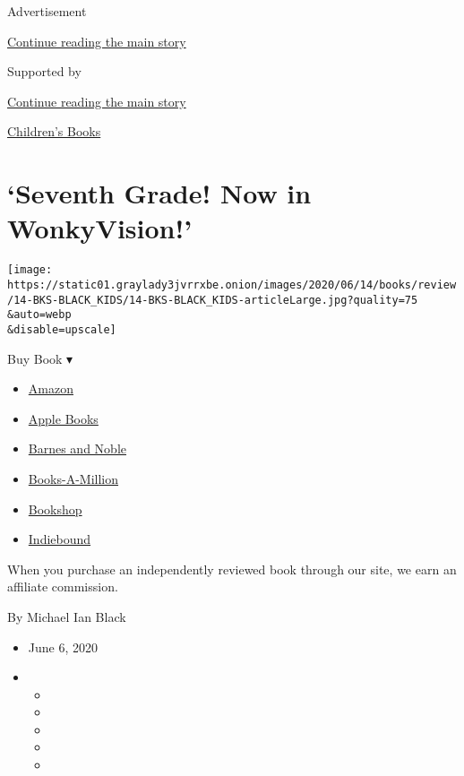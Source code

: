 Advertisement

\protect\hyperlink{after-top}{Continue reading the main story}

Supported by

\protect\hyperlink{after-sponsor}{Continue reading the main story}

\href{/column/childrens-books}{Children's Books}

\hypertarget{seventh-grade-now-in-wonkyvision}{%
\section{`Seventh Grade! Now in
WonkyVision!'}\label{seventh-grade-now-in-wonkyvision}}

\texttt{[image: https://static01.graylady3jvrrxbe.onion/images/2020/06/14/books/review/14-BKS-BLACK\_KIDS/14-BKS-BLACK\_KIDS-articleLarge.jpg?quality=75\\\&auto=webp\\\&disable=upscale]}

Buy Book ▾

\begin{itemize}
\tightlist
\item
  \href{https://www.amazon.com/gp/search?index=books\&tag=NYTBSREV-20\&field-keywords=Wink+Rob+Harrell}{Amazon}
\item
  \href{https://du-gae-books-dot-nyt-du-prd.appspot.com/buy?title=Wink\&author=Rob+Harrell}{Apple
  Books}
\item
  \href{https://www.anrdoezrs.net/click-7990613-11819508?url=https\%3A\%2F\%2Fwww.barnesandnoble.com\%2Fw\%2F\%3Fean\%3D9781984815149}{Barnes
  and Noble}
\item
  \href{https://www.anrdoezrs.net/click-7990613-35140?url=https\%3A\%2F\%2Fwww.booksamillion.com\%2Fp\%2FWink\%2FRob\%2BHarrell\%2F9781984815149}{Books-A-Million}
\item
  \href{https://bookshop.org/a/3546/9781984815149}{Bookshop}
\item
  \href{https://www.indiebound.org/book/9781984815149?aff=NYT}{Indiebound}
\end{itemize}

When you purchase an independently reviewed book through our site, we
earn an affiliate commission.

By Michael Ian Black

\begin{itemize}
\item
  June 6, 2020
\item
  \begin{itemize}
  \item
  \item
  \item
  \item
  \item
  \end{itemize}
\end{itemize}

